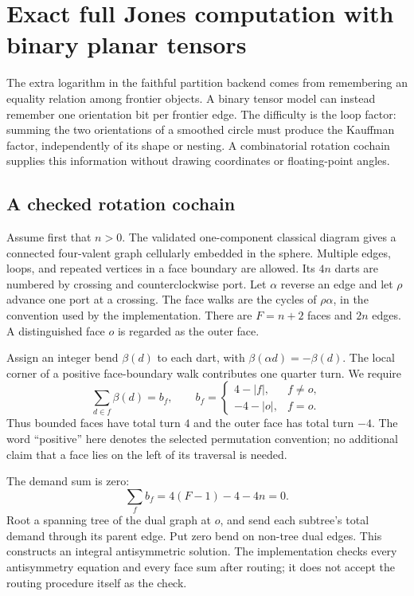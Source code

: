 \section{Exact full Jones computation with binary planar tensors}
\label{sec:tensor}

The extra logarithm in the faithful partition backend comes from remembering
an equality relation among frontier objects. A binary tensor model can instead
remember one orientation bit per frontier edge. The difficulty is the loop
factor: summing the two orientations of a smoothed circle must produce the
Kauffman factor, independently of its shape or nesting. A combinatorial
rotation cochain supplies this information without drawing coordinates or
floating-point angles.

\subsection{A checked rotation cochain}

Assume first that $n>0$. The validated one-component classical diagram gives
a connected four-valent graph cellularly embedded in the sphere. Multiple
edges, loops, and repeated vertices in a face boundary are allowed. Its
$4n$ darts are numbered by crossing and counterclockwise port. Let $\alpha$
reverse an edge and let $\rho$ advance one port at a crossing. The face walks
are the cycles of $\rho\alpha$, in the convention used by the implementation.
There are $F=n+2$ faces and $2n$ edges. A distinguished face $o$ is regarded as
the outer face.

Assign an integer bend $\beta(d)$ to each dart, with
$\beta(\alpha d)=-\beta(d)$. The local corner of a positive face-boundary
walk contributes one quarter turn. We require
\begin{equation}
 \sum_{d\in f}\beta(d)=b_f,\qquad
 b_f=\begin{cases}4-|f|,&f\ne o,\\-4-|o|,&f=o.\end{cases}
 \label{eq:face-bends}
\end{equation}
Thus bounded faces have total turn $4$ and the outer face has total turn
$-4$. The word ``positive'' here denotes the selected permutation convention;
no additional claim that a face lies on the left of its traversal is needed.

The demand sum is zero:
\[
 \sum_f b_f=4(F-1)-4-4n=0.
\]
Root a spanning tree of the dual graph at $o$, and send each subtree's total
demand through its parent edge. Put zero bend on non-tree dual edges. This
constructs an integral antisymmetric solution. The implementation checks
every antisymmetry equation and every face sum after routing; it does not
accept the routing procedure itself as the check.

